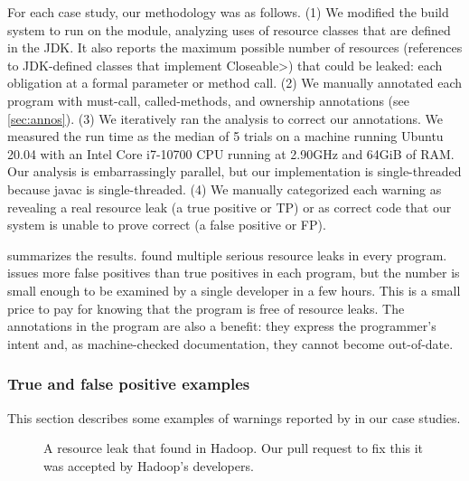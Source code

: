 For each case study, our methodology was as follows.
(1)
We modified the
build system to run \tool on the module, analyzing uses of resource
classes that are defined in the JDK\@.
It also reports the maximum possible number of resources (references to JDK-defined
classes that implement \<Closeable>) that could be
leaked:  each obligation at a formal parameter or method call.
(2) We manually
annotated each program with must-call, called-methods, and ownership
annotations (see \cref{sec:annos}).
(3) We iteratively ran the analysis to correct our annotations.
We measured the run time
as the median of 5 trials on
a machine running Ubuntu 20.04 with an Intel Core i7-10700 CPU running at 2.90GHz and 64GiB of RAM\@.
Our analysis is embarrassingly parallel, but our implementation is
single-threaded because javac is single-threaded.
(4) We manually categorized each warning as revealing a
real resource leak (a true positive or TP) or as correct code that our
system is unable to prove correct (a false positive or FP\@).

 summarizes the results. \Tool found multiple
serious resource leaks in every program. \Tool issues
more false positives than true positives in each program, but
the number is small enough to be examined by a single developer in a
few hours.  This is a small price to pay for knowing that the program is
free of resource leaks.  The annotations in the program are
also a benefit: they
express the programmer's intent and, as machine-checked documentation,
they cannot become out-of-date.

\subsubsection{True and false positive examples}
\label{sec:examples}

This section describes some examples of warnings reported by \tool
in our case studies.

\begin{figure}
  
  \prefigcaption
  \caption{A resource leak that \tool found in Hadoop. Our pull request
    to fix this it was accepted by Hadoop's developers.}
  \label{fig:hadoop-bug}
\end{figure}

